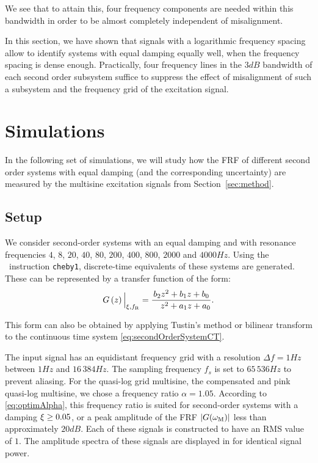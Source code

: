   We see that to attain this, four frequency components are needed within this bandwidth in order to be almost completely independent of misalignment.

  In this section, we have shown that signals with a logarithmic frequency spacing allow to identify systems with equal damping equally well, when the frequency spacing is dense enough.
  Practically, four frequency lines in the $3\unit{dB}$ bandwidth of each second order subsystem suffice to suppress the effect of misalignment of such a subsystem and the frequency grid of the excitation signal.
  
\section{Simulations} \label{sec:simulation}
In the following set of simulations, we will study how the FRF of different second order systems with equal damping (and the corresponding uncertainty) are measured by the multisine excitation signals from Section~\ref{sec:method}.
  \subsection{Setup}
  We consider second-order systems with an equal damping and with resonance frequencies $4$, $8$, $20$, $40$, $80$, $200$, $400$, $800$, $2000$ and $4000 \unit{Hz}$.
  Using the \matlab\ instruction \texttt{cheby1}, discrete-time equivalents of these systems are generated.
  These can be represented by a transfer function of the form:
  \begin{equation}
    G \left( z \right)\Big|_{\damping, \fR} =
       \frac{         b_2  z^{2} + b_1 z + b_0}%
            {\phantom{a_2} z^{2} + a_1 z + a_0}
  \text{.}
  \label{eq:excitation:secondOrderSystemDTidentifiable}
  \end{equation}

  This form can also be obtained by applying Tustin's method or bilinear transform \citep{Oppenheim1983} to the continuous time system \eqref{eq:secondOrderSystemCT}.

  The input signal has an equidistant frequency grid with a resolution $\Delta f = 1\unit{Hz}$ between $1 \unit{Hz}$ and $16\,384\unit{Hz}$.
  The sampling frequency $f_s$ is set to $65\,536\unit{Hz}$ to prevent aliasing.
  For the quasi-log grid multisine, the compensated and pink quasi-log multisine, we chose a frequency ratio $\alpha = 1.05$.
  According to \eqref{eq:optimAlpha}, this frequency ratio is suited for second-order systems with a damping $\xi \geq 0.05$, or a peak amplitude of the FRF $\left| G(\omega_{\mathrm{M}}) \right|$ less than approximately $20\unit{dB}$.
  Each of these signals is constructed to have an RMS value of $1$.
  The amplitude spectra of these signals are displayed in  for identical signal power.

